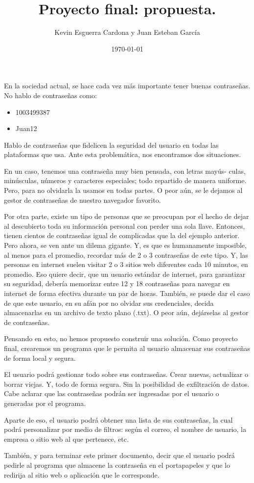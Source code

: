 \documentclass[12pt, letterpaper]{article}
\title{Proyecto final: propuesta.}
\author{Kevin Esguerra Cardona y Juan Esteban García}
\date{\today}
\begin{document}
\maketitle

En la sociedad actual, se hace cada vez más importante tener buenas contraseñas. No hablo de contraseñas como:
\begin{itemize}
   \item 1003499387
   \item Juan12
\end{itemize}
Hablo de contraseñas que fidelicen la seguridad del usuario en todas las plataformas que usa. Ante esta problemática, nos encontramos dos situaciones.

En un caso, tenemos una contraseña muy bien pensada, con letras mayús- culas, minúsculas, números y caracteres especiales; todo repartido de manera uniforme. Pero, para no olvidarla la usamos en todas partes. O peor aún, se le dejamos al gestor de contraseñas de nuestro navegador favorito.

Por otra parte, existe un tipo de personas que se preocupan por el hecho de dejar al descubierto toda su información personal con perder una sola llave. Entonces, tienen cientos de contraseñas igual de complicadas que la del ejemplo anterior. Pero ahora, se ven ante un dilema gigante. Y, es que es humanamente imposible, al menos para el promedio, recordar más de 2 o 3 contraseñas de este tipo. Y, las personas en internet suelen visitar 2 o 3 sitios web diferentes cada 10 minutos, en promedio. Eso quiere decir, que un usuario estándar de internet, para garantizar su seguridad, debería memorizar entre 12 y 18 contraseñas para navegar en internet de forma efectiva durante un par de horas. También, se puede dar el caso de que este usuario, en su afán por no olvidar sus credenciales, decida almacenarlas en un archivo de texto plano (.txt). O peor aún, dejárselas al gestor de contraseñas.

Pensando en esto, no hemos propuesto construir una solución. Como proyecto final, crearemos un programa que le permita al usuario almacenar sus contraseñas de forma local y segura.

El usuario podrá gestionar todo sobre sus contraseñas. Crear nuevas, actualizar o borrar viejas. Y, todo de forma segura. Sin la posibilidad de exfiltración de datos. Cabe aclarar que las contraseñas podrán ser ingresadas por el usuario o generadas por el programa.

Aparte de eso, el usuario podrá obtener una lista de sus contraseñas, la cual podrá personalizar por medio de filtros: según el correo, el nombre de usuario, la empresa o sitio web al que pertenece, etc.

También, y para terminar este primer documento, decir que el usuario podrá pedirle al programa que almacene la contraseña en el portapapeles y que lo redirija al sitio web o aplicación que le corresponde.
\end{document}
